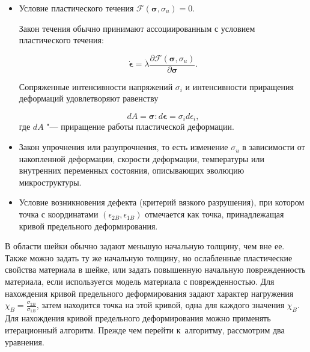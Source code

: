 \begin{itemize}



\item[1.] Условие пластического течения $\mathcal{F}\left( \boldsymbol{\sigma}, \sigma_u \right) = 0.$ 

Закон течения обычно принимают ассоциированным с условием пластического течения:

\begin{equation}

\dot{\boldsymbol{\epsilon}} = \dot{\lambda}\frac{\partial \mathcal{F}\left( \boldsymbol{\sigma}, \sigma_u  \right)}{\partial \boldsymbol{\sigma}}.

\end{equation} 

Сопряженные интенсивности напряжений $\sigma_i$ и интенсивности приращения деформаций удовлетворяют равенству 

$$dA = \boldsymbol{\sigma}:d\boldsymbol{\epsilon} = \sigma_i d\epsilon_i,$$ где $dA$ "--- приращение работы пластической деформации. 

\item[2.] Закон упрочнения или разупрочнения, то есть изменение $\sigma_u$ в зависимости от накопленной деформации, скорости деформации, температуры или внутренних переменных состояния, описывающих эволюцию микроструктуры.

\item[3.] Условие возникновения дефекта (критерий вязкого разрушения), при котором точка с координатами $(\epsilon_{2B},\epsilon_{1B})$ отмечается как точка, принадлежащая кривой предельного деформирования.



\end{itemize}



В области шейки обычно задают меньшую начальную толщину, чем вне ее. Также можно задать ту же начальную толщину, но ослабленные пластические свойства материала в шейке, или задать повышенную начальную поврежденность материала, если используется модель материала с поврежденностью. Для нахождения кривой предельного деформирования задают характер нагружения $\chi_B = \frac{ \sigma_{2B}}{\sigma_{1B}}$, затем находится точка на этой кривой, одна для каждого значения $\chi_B$. Для нахождения кривой предельного деформирования можно применять итерационный алгоритм. Прежде чем перейти к~алгоритму, рассмотрим два уравнения.  



